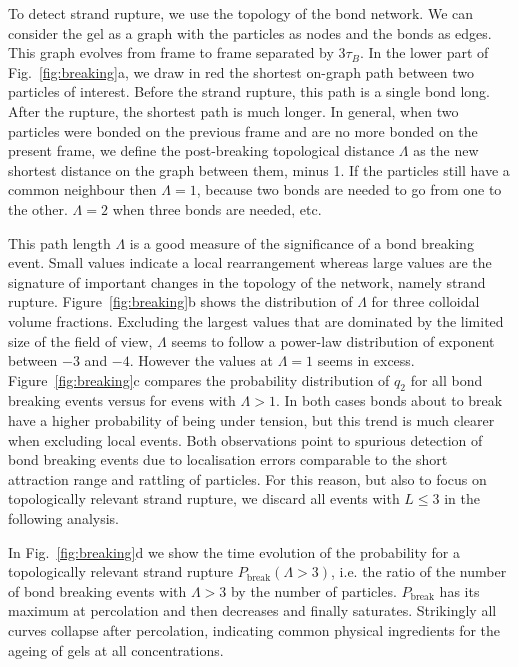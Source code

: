 \documentclass[preprint,footinbib,amsmath,amssymb,superscriptaddress]{revtex4}
\begin{document}
To detect strand rupture, we use the topology of the bond network. We can consider the gel as a graph with the particles as nodes and the bonds as edges. This graph evolves from frame to frame separated by $3\tau_B$. In the lower part of Fig.~\ref{fig:breaking}a, we draw in red the shortest on-graph path between two particles of interest. Before the strand rupture, this path is a single bond long. After the rupture, the shortest path is much longer. In general, when two particles were bonded on the previous frame and are no more bonded on the present frame, we define the post-breaking topological distance $\Lambda$ as the new shortest distance on the graph between them, minus 1. If the particles still have a common neighbour then $\Lambda=1$, because two bonds are needed to go from one to the other. $\Lambda=2$ when three bonds are needed, etc.

This path length $\Lambda$ is a good measure of the significance of a bond breaking event. Small values indicate a local rearrangement whereas large values are the signature of important changes in the topology of the network, namely strand rupture. Figure~\ref{fig:breaking}b shows the distribution of $\Lambda$ for three colloidal volume fractions. Excluding the largest values that are dominated by the limited size of the field of view, $\Lambda$ seems to follow a power-law distribution of exponent between $-3$ and $-4$. However the values at $\Lambda=1$ seems in excess. Figure~\ref{fig:breaking}c compares the probability distribution of $q_2$ for all bond breaking events versus for evens with $\Lambda>1$. In both cases bonds about to break have a higher probability of being under tension, but this trend is much clearer when excluding local events. Both observations point to spurious detection of bond breaking events due to localisation errors comparable to the short attraction range and rattling of particles. For this reason, but also to focus on topologically relevant strand rupture, we discard all events with $L \leq 3$ in the following analysis.

In Fig.~\ref{fig:breaking}d we show the time evolution of the probability for a topologically relevant strand rupture $P_\text{break}(\Lambda>3)$, i.e. the ratio of the number of bond breaking events with $\Lambda>3$ by the number of particles. $P_\text{break}$ has its maximum at percolation and then decreases and finally saturates. Strikingly all curves collapse after percolation, indicating common physical ingredients for the ageing of gels at all concentrations.
\end{document}
